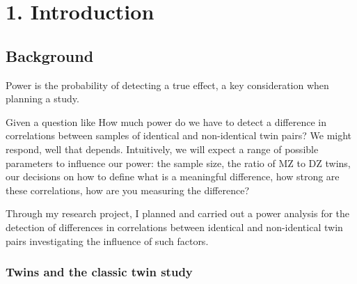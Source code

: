 \chapter*{1. Introduction}
\setcounter{chapter}{1}

			

\large



\section{Background}

Power is the probability of detecting a true effect, a key consideration when planning a study.

Given a question like How much power do we have to detect a difference in correlations between samples of identical and non-identical twin pairs? We might respond, well that depends.  Intuitively, we will expect a range of possible parameters to influence our power: the sample size, the ratio of MZ to DZ twins, our decisions on how to define what is a meaningful difference, how strong are these correlations, how are you measuring the difference?

Through my research project, I planned and carried out a power analysis for the detection of differences in correlations between identical and non-identical twin pairs investigating the influence of such factors.  

\subsection{Twins and the classic twin study}

